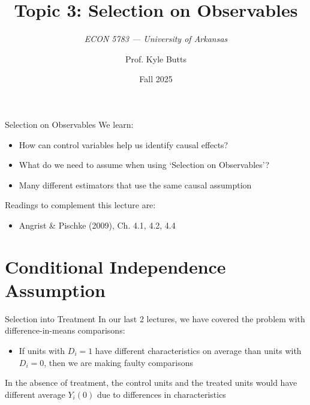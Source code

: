 \documentclass[aspectratio=169,t,11pt,table]{beamer}
\title{Topic 3: Selection on Observables}
\subtitle{\it  ECON 5783 — University of Arkansas}
\date{Fall 2025}
\author{Prof. Kyle Butts}
\begin{document}
\begin{frame}
\maketitle

\end{frame}

\begin{frame}{Selection on Observables}
  We learn:
  \begin{itemize}
    \item How can control variables help us identify causal effects?
    \item What do we need to assume when using `Selection on Observables'?
    \item Many different estimators that use the same causal assumption
  \end{itemize}

  \bigskip
  Readings to complement this lecture are:
  \begin{itemize}
    \item Angrist & Pischke (2009), Ch. 4.1, 4.2, 4.4
  \end{itemize}
\end{frame}

\section{Conditional Independence Assumption}

\begin{frame}{Selection into Treatment}
  In our last 2 lectures, we have covered the problem with difference-in-means comparisons:
  \begin{itemize}
    \item If units with $D_i = 1$ have different characteristics on average than units with $D_i = 0$, then we are making faulty comparisons
  \end{itemize}

  \pause
  \bigskip
  In the absence of treatment, the control units and the treated units would have different average $Y_i(0)$ due to differences in characteristics
\end{frame}
\end{document}
